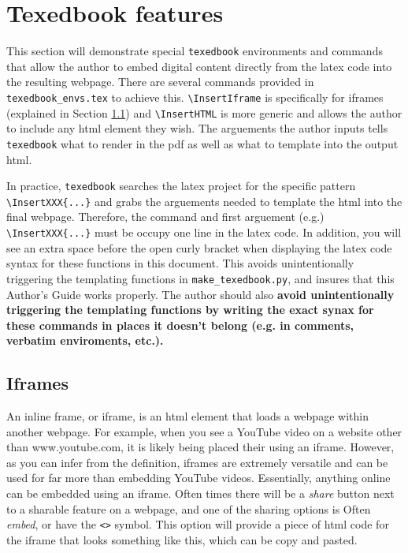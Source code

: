 \documentclass{article}
\begin{document}
\section{Texedbook features}
This section will demonstrate special \verb'texedbook' environments and commands that allow the author to embed digital content directly from the latex code into the resulting webpage. There are several commands provided in \verb'texedbook_envs.tex' to achieve this. \verb'\InsertIframe' is specifically for iframes (explained in Section \ref{sec:iframes}) and \verb'\InsertHTML' is more generic and allows the author to include any html element they wish. The arguements the author inputs tells \verb'texedbook' what to render in the pdf as well as what to template into the output html. 

In practice, \verb'texedbook' searches the latex project for the specific pattern \verb'\InsertXXX{...}' and grabs the arguements needed to template the html into the final webpage. Therefore, the command and first arguement (e.g.) \verb'\InsertXXX{...}' must be occupy one line in the latex code. In addition, you will see an extra space before the open curly bracket when displaying the latex code syntax for these functions in this document. This avoids unintentionally triggering the templating functions in \verb'make_texedbook.py', and insures that this Author's Guide works properly. The author should also \textbf{avoid unintentionally triggering the templating functions by writing the exact synax for these commands in places it doesn't belong (e.g. in comments, verbatim enviroments, etc.).}

\subsection{Iframes} \label{sec:iframes}
An inline frame, or iframe, is an html element that loads a webpage within another webpage. For example, when you see a YouTube video on a website other than www.youtube.com, it is likely being placed their using an iframe. However, as you can infer from the definition, iframes are extremely versatile and can be used for far more than embedding YouTube videos. Essentially, anything online can be embedded using an iframe. Often times there will be a \textit{share} button next to a sharable feature on a webpage, and one of the sharing options is Often \textit{embed}, or have the \verb'<>' symbol. This option will provide a piece of html code for the iframe that looks something like this, which can be copy and pasted. 
\end{document}
